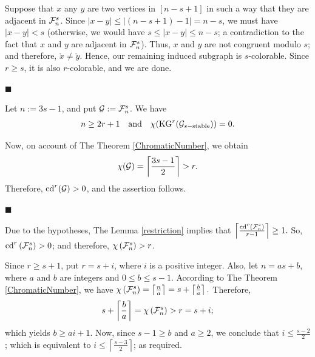 \documentclass[11pt]{article}
\begin{document}
		\noindent
		Suppose that $x$ any $y$ are two vertices in $[n-s+1]$ in such a way that they are adjacent
		in ${\cal F}_{n}^{s}$. Since $|x-y|\leq |(n-s+1)-1|= n-s$, we must have $|x-y| < s$ (otherwise, we would have $s \leq |x-y|\leq n-s$; a contradiction to the fact that $x$ and $y$ are adjacent in ${\cal F}_{n}^{s}$).
		Thus, $x$ and $y$ are not congruent modulo $s$; and therefore, $\mathring{x} \neq \mathring{y}$. Hence, our remaining induced subgraph is $s$-colorable. Since $r\geq s$,
		it is also $r$-colorable, and we are done.
		
		\hfill{$\blacksquare$}




	Let $n:=3s-1$, and put ${\cal G} :=  {\cal F}_{n}^{s} $.
	We have
	$$\begin{array}[1]{ccc}
		n\geq 2r + 1   &   {\rm and}    &  \chi ({\rm KG}^r ({\cal G}_{s-{\rm stable}})) =0.
	\end{array}$$

    \noindent 
    Now, on account of The Theorem \ref{ChromaticNumber}, we obtain
    $$\chi ({\cal G})
     = \left\lceil  \frac{3s-1}{2} \right\rceil   > r.$$
     Therefore, ${\rm cd} ^r ({\cal G}) > 0$, and the assertion follows.
     
 	 \hfill{$\blacksquare$}



		Due to the hypotheses, The Lemma \ref{restriction} implies that
		$\left\lceil  \frac{{\rm cd}^r \left({\cal F}_{n}^{s}\right)}{r-1}   \right\rceil  \geq 1.$
		So, ${\rm cd}^r \left({\cal F}_{n}^{s}\right) > 0$; and therefore, $\chi \left({\cal F}_{n}^{s}\right) > r$.
		
		\noindent
		Since $r \geq s+1$, put $r=s+i$, where $i$ is a positive integer. Also, let $n=as+b$, where $a$ and $b$ are integers and $0 \leq b \leq s-1.$
		According to The Theorem \ref{ChromaticNumber}, we have
		$\chi \left({\cal F}_{n}^{s}\right) = \left\lceil  \frac{n}{a}  \right\rceil 
		= s + \left\lceil  \frac{b}{a}  \right\rceil.$
		Therefore,
		$$s + \left\lceil  \frac{b}{a}  \right\rceil = \chi \left({\cal F}_{n}^{s}\right) 
		> r=s+i;	$$
		which yields $b \geq ai+1.$
		Now, since $s-1 \geq b$ and $a \geq 2$, we conclude that $i \leq \frac{s-2}{2}$; which is equivalent to $i \leq \left\lceil  \frac{s-3}{2}  \right\rceil$; as required.
\end{document}
